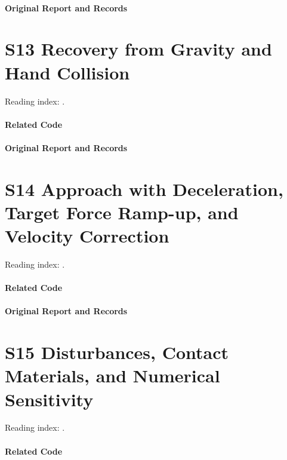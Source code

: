 \paragraph{Original Report and Records}
\noindent{}\par
\section*{S13 Recovery from Gravity and Hand Collision}
\hypertarget{code-s13}{}
Reading index: .
\paragraph{Related Code}
\noindent{}\par
\paragraph{Original Report and Records}
\noindent{}\par
\section*{S14 Approach with Deceleration, Target Force Ramp-up, and Velocity Correction}
\hypertarget{code-s14}{}
Reading index: .
\paragraph{Related Code}
\noindent{}\par
\paragraph{Original Report and Records}
\noindent{}\par
\section*{S15 Disturbances, Contact Materials, and Numerical Sensitivity}
\hypertarget{code-s15}{}
Reading index: .
\paragraph{Related Code}
\noindent{}\par
